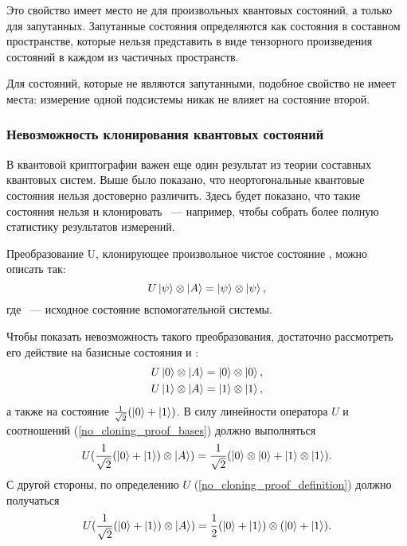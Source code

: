 Это свойство имеет место не для произвольных квантовых состояний, а только для запутанных. Запутанные состояния определяются как состояния в составном пространстве, которые нельзя представить в виде тензорного произведения состояний в каждом из частичных пространств.

Для состояний, которые не являются запутанными, подобное свойство не имеет места: измерение одной подсистемы никак не влияет на состояние второй.

\subsubsection{Невозможность клонирования квантовых состояний}\label{no_cloning_theorem}
В квантовой криптографии важен еще один результат из теории составных квантовых систем. Выше было показано, что неортогональные квантовые состояния нельзя достоверно различить. Здесь будет показано, что такие состояния нельзя и клонировать \cite{no_cloning_theorem}~--- например, чтобы собрать более полную статистику результатов измерений.

Преобразование U, клонирующее произвольное чистое состояние \state{\psi}, можно описать так:
\begin{equation}\label{no_cloning_proof_definition}
  U\left| \psi \right\rangle\otimes\left| A \right\rangle = \left| \psi \right\rangle\otimes\left| \psi \right\rangle,  
\end{equation}
где ~--- исходное состояние вспомогательной системы.

Чтобы показать невозможность такого преобразования, достаточно рассмотреть его действие на базисные состояния  и :
\begin{eqnarray}\label{no_cloning_proof_bases}
  U\left| 0 \right\rangle\otimes\left| A \right\rangle = \left| 0 \right\rangle\otimes\left| 0 \right\rangle, \nonumber\\
  U\left| 1 \right\rangle\otimes\left| A \right\rangle = \left| 1 \right\rangle\otimes\left| 1 \right\rangle,
\end{eqnarray}
а также на состояние $\frac{1}{\sqrt{2}}(\left| 0 \right\rangle + \left| 1 \right\rangle)$. В силу линейности оператора $U$ и соотношений (\ref{no_cloning_proof_bases}) должно выполняться
\begin{equation}U(\frac{1}{\sqrt{2}}(\left| 0 \right\rangle + \left| 1 \right\rangle) \otimes \left| A \right\rangle) = \frac{1}{\sqrt{2}}(\left| 0 \right\rangle \otimes \left| 0 \right\rangle + \left| 1 \right\rangle \otimes \left| 1 \right\rangle).\end{equation}
С другой стороны, по определению $U$ (\ref{no_cloning_proof_definition}) должно получаться
\begin{equation}U(\frac{1}{\sqrt{2}}(\left| 0 \right\rangle + \left| 1 \right\rangle) \otimes \left| A \right\rangle) = \frac{1}{2}(\left| 0 \right\rangle + \left| 1 \right\rangle) \otimes (\left| 0 \right\rangle + \left| 1 \right\rangle).\end{equation}

